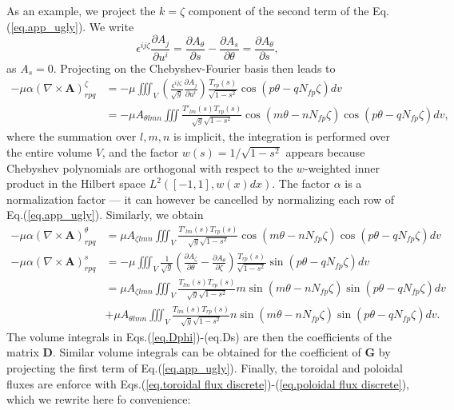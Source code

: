 As an example, we project the $k=\zeta$ component of the second term of the Eq.(\ref{eq.app_ugly}). We write
\begin{equation}
	\epsilon^{ij\zeta}\frac{\partial A_j}{\partial u^i} = \frac{\partial A_\theta}{\partial s} - \frac{\partial A_s}{\partial \theta} = \frac{\partial A_\theta}{\partial s},
\end{equation} 
as $A_s=0$. Projecting on the Chebyshev-Fourier basis then leads to
\begin{align}
	-\mu\alpha (\nabla\times\mathbf{A})^\zeta_{rpq} &=-\mu\iiint_V \left(\frac{\epsilon^{ij\zeta}}{\sqrt{g}}\frac{\partial A_j}{\partial u^i}\right)\frac{T_{rp}(s)}{\sqrt{1-s^2}}\cos(p\theta-qN_{fp}\zeta)dv \\
	&=-\mu A_{\theta lmn}\iiint \frac{T'_{lm}(s)T_{rp}(s)}{\sqrt{g}\sqrt{1-s^2}}\cos(m\theta-nN_{fp}\zeta)\cos(p\theta-qN_{fp}\zeta)dv, \label{eq.Dphi}
\end{align}
where the summation over $l,m,n$ is implicit, the integration is performed over the entire volume $V$, and the factor $w(s)=1/\sqrt{1-s^2}$ appears because Chebyshev polynomials are orthogonal with respect to the $w$-weighted inner product in the Hilbert space $L^2([-1,1],w(x)dx)$. The factor $\alpha$ is a normalization factor --- it can however be cancelled by normalizing each row of Eq.(\ref{eq.app_ugly}). Similarly, we obtain
\begin{align}
	-\mu\alpha(\nabla\times\mathbf{A})^\theta_{rpq} &= \mu A_{\zeta lmn}\iiint_V \frac{T'_{lm}(s)T_{rp}(s)}{\sqrt{g}\sqrt{1-s^2}}\cos(m\theta-nN_{fp}\zeta)\cos(p\theta-qN_{fp}\zeta)dv\\
	-\mu\alpha(\nabla\times\mathbf{A})^s_{rpq} &= -\mu\iiint_V\frac{1}{\sqrt{g}}\left(\frac{\partial A_\zeta}{\partial \theta}-\frac{\partial A_\theta}{\partial \zeta}\right)\frac{T_{rp}(s)}{\sqrt{1-s^2}}\sin(p\theta-qN_{fp}\zeta)dv\\
	&= \mu A_{\zeta lmn}\iiint_V \frac{T_{lm}(s)T_{rp}(s)}{\sqrt{g}\sqrt{1-s^2}} m\sin(m\theta-nN_{fp}\zeta)\sin(p\theta-qN_{fp}\zeta)dv\\
	&+ \mu A_{\theta lmn}\iiint_V \frac{T_{lm}(s)T_{rp}(s)}{\sqrt{g}\sqrt{1-s^2}} n\sin(m\theta-nN_{fp}\zeta)\sin(p\theta-qN_{fp}\zeta)dv.\label{eq.Ds2}
\end{align}
The volume integrals in Eqs.(\ref{eq.Dphi})-(eq.{Ds}) are then the coefficients of the matrix $\mathbf{D}$. Similar volume integrals can be obtained for the coefficient of $\mathbf{G}$ by projecting the first term of Eq.(\ref{eq.app_ugly}). Finally, the toroidal and poloidal fluxes are enforce with Eqs.(\ref{eq.toroidal flux discrete})-(\ref{eq.poloidal flux discrete}), which we rewrite here fo convenience:

